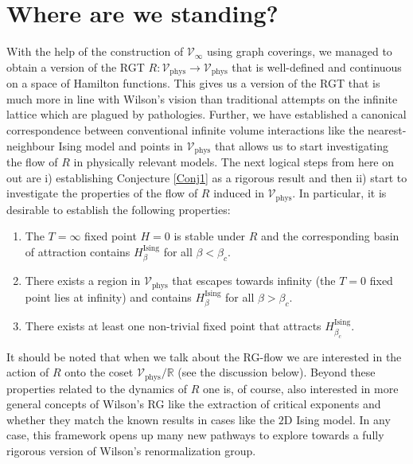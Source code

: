 \documentclass{article}
\newcommand{\phys}{\mathrm{phys}}
\begin{document}
\section{Where are we standing?}\label{Sec3}

With the help of the construction of $\mathcal{V}_\infty$ using graph coverings, we managed to obtain a version of the RGT $R:\mathcal{V}_\phys\to \mathcal{V}_\phys$ that is well-defined and continuous on a space of Hamilton functions. This gives us a version of the RGT that is much more in line with Wilson's vision than traditional attempts on the infinite lattice which are plagued by pathologies. Further, we have established a canonical correspondence between conventional infinite volume interactions like the nearest-neighbour Ising model and points in $\mathcal{V}_\phys$ that allows us to start investigating the flow of $R$ in physically relevant models. The next logical steps from here on out are i) establishing Conjecture \ref{Conj1} as a rigorous result and then ii) start to investigate the properties of the flow of $R$ induced in $\mathcal{V}_\phys$. In particular, it is desirable to establish the following properties:
\begin{enumerate}
    \item[a)] The $T=\infty$ fixed point $H=0$ is stable under $R$ and the corresponding basin of attraction contains $H_\beta^\mathrm{Ising}$ for all $\beta<\beta_c$.
    \item[b)] There exists a region in $\mathcal{V}_\phys$ that escapes towards infinity (the $T=0$ fixed point lies at infinity) and contains $H_\beta^\mathrm{Ising}$ for all $\beta>\beta_c$.
    \item[c)] There exists at least one non-trivial fixed point that attracts $H_{\beta_c}^\mathrm{Ising}$.
\end{enumerate}
It should be noted that when we talk about the RG-flow we are interested in the action of $R$ onto the coset $\mathcal{V}_\phys/\mathds{R}$ (see the discussion below). Beyond these properties related to the dynamics of $R$ one is, of course, also interested in more general concepts of Wilson's RG like the extraction of critical exponents and whether they match the known results in cases like the $2\mathrm{D}$ Ising model. In any case, this framework opens up many new pathways to explore towards a fully rigorous version of Wilson's renormalization group. 

\bigskip
\end{document}

